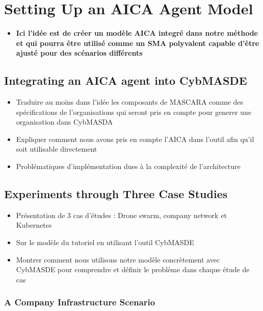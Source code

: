 \chapter{Setting Up an AICA Agent Model}\label{ch:aica_model} %

\begin{itemize}
    \item \textbf{Ici l'idée est de créer un modèle AICA integré dans notre méthode et qui pourra être utilisé comme un SMA polyvalent capable d'être ajusté pour des scénarios différents}
\end{itemize}


\section{Integrating an AICA agent into CybMASDE}
\begin{itemize}
    \item Traduire au moins dans l'idée les composants de MASCARA comme des spécifications de l'organisations qui seront pris en compte pour generer une organisation dans CybMASDA
    \item Expliquer comment nous avons pris en compte l'AICA dans l'outil afin qu'il soit utilisable directement
    \item Problématiques d'implémentation dues à la complexité de l'architecture
\end{itemize}


\section{Experiments through Three Case Studies}
\begin{itemize}
    \item Présentation de 3 cas d’études : Drone swarm, company network et Kubernetes
    \item Sur le modèle du tutoriel en utilisant l'outil CybMASDE
    \item Montrer comment nous utilisons notre modèle concrètement avec CybMASDE pour comprendre et définir le problème dans chaque étude de cas
\end{itemize}

\subsection{A Company Infrastructure Scenario}
